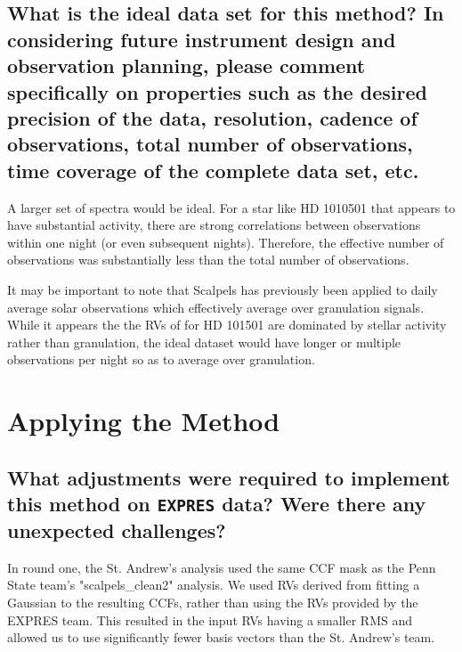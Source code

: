 \documentclass[12pt]{article}
\begin{document}
\subsection{What is the ideal data set for this method?  In considering future instrument design and observation planning, please comment specifically on properties such as the desired precision of the data, resolution, cadence of observations, total number of observations, time coverage of the complete data set, etc.}

A larger set of spectra would be ideal.  For a star like HD 1010501 that appears to have substantial activity, there are strong correlations between observations within one night (or even subsequent nights).  Therefore, the effective number of observations was substantially less than the total number of observations.

It may be important to note that Scalpels has previously been applied to daily average solar observations which effectively average over granulation signals.  While it appears the the RVs of for HD 101501 are dominated by stellar activity rather than granulation, the ideal dataset would have longer or multiple observations per night so as to average over granulation.





\section{Applying the Method}
\subsection{What adjustments were required to implement this method on \texttt{EXPRES} data?  Were there any unexpected challenges?}

In round one, the St. Andrew's analysis used the same CCF mask as the Penn State team's "scalpels_clean2" analysis.
We used RVs derived from fitting a Gaussian to the resulting CCFs, rather than using the RVs provided by the EXPRES team.  This resulted in the input RVs having a smaller RMS and allowed us to use significantly fewer basis vectors than the St. Andrew's team.
\end{document}
